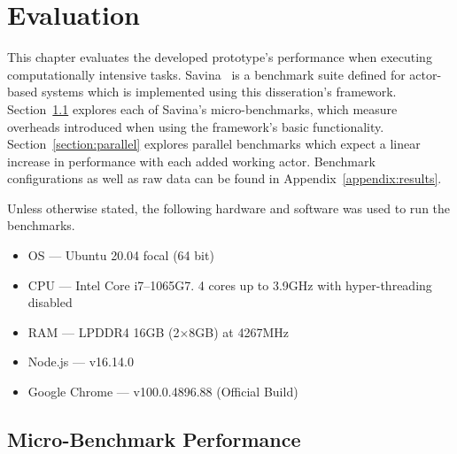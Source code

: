\documentclass[oneside]{um-fict}
\begin{document}
\chapter{Evaluation}\label{chap:evaluation}
This chapter evaluates the developed prototype's performance when executing computationally intensive tasks. Savina~\cite{savina} is a benchmark suite defined for actor-based systems which is implemented using this disseration's framework. Section~\ref{section:microbenchmark} explores each of Savina's micro-benchmarks, which measure overheads introduced when using the framework's basic functionality. Section~\ref{section:parallel} explores parallel benchmarks which expect a linear increase in performance with each added working actor. Benchmark configurations as well as raw data can be found in Appendix~\ref{appendix:results}.

Unless otherwise stated, the following hardware and software was used to run the benchmarks.
\begin{itemize}
    \item OS --- Ubuntu 20.04 focal (64 bit)
    \item CPU --- Intel Core i7--1065G7. 4 cores up to 3.9GHz with hyper-threading disabled
    \item RAM --- LPDDR4 16GB (2$\times$8GB) at 4267MHz
    \item Node.js --- v16.14.0
    \item Google Chrome --- v100.0.4896.88 (Official Build)
\end{itemize}

\section{Micro-Benchmark Performance}\label{section:microbenchmark}
\end{document}
